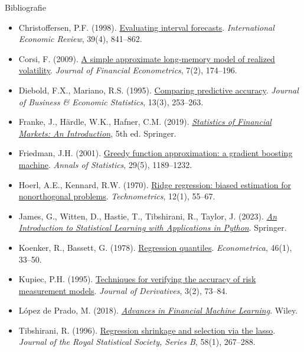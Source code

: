 \begin{frame}{Bibliografie}
\itemsize{\tiny}
\begin{itemize}
    \item Christoffersen, P.F. (1998). \href{https://doi.org/10.2307/2527341}{Evaluating interval forecasts}. \textit{International Economic Review}, 39(4), 841--862.
    \item Corsi, F. (2009). \href{https://doi.org/10.1093/jjfinec/nbp001}{A simple approximate long-memory model of realized volatility}. \textit{Journal of Financial Econometrics}, 7(2), 174--196.
    \item Diebold, F.X., Mariano, R.S. (1995). \href{https://doi.org/10.1080/07350015.1995.10524599}{Comparing predictive accuracy}. \textit{Journal of Business \& Economic Statistics}, 13(3), 253--263.
    \item Franke, J., Härdle, W.K., Hafner, C.M. (2019). \href{https://doi.org/10.1007/978-3-030-13751-9}{\textit{Statistics of Financial Markets: An Introduction}}, 5th ed. Springer.
    \item Friedman, J.H. (2001). \href{https://doi.org/10.1214/aos/1013203451}{Greedy function approximation: a gradient boosting machine}. \textit{Annals of Statistics}, 29(5), 1189--1232.
    \item Hoerl, A.E., Kennard, R.W. (1970). \href{https://doi.org/10.1080/00401706.1970.10488634}{Ridge regression: biased estimation for nonorthogonal problems}. \textit{Technometrics}, 12(1), 55--67.
    \item James, G., Witten, D., Hastie, T., Tibshirani, R., Taylor, J. (2023). \href{https://doi.org/10.1007/978-3-031-38747-0}{\textit{An Introduction to Statistical Learning with Applications in Python}}. Springer.
    \item Koenker, R., Bassett, G. (1978). \href{https://doi.org/10.2307/1913643}{Regression quantiles}. \textit{Econometrica}, 46(1), 33--50.
    \item Kupiec, P.H. (1995). \href{https://doi.org/10.3905/jod.1995.407942}{Techniques for verifying the accuracy of risk measurement models}. \textit{Journal of Derivatives}, 3(2), 73--84.
    \item López de Prado, M. (2018). \href{https://www.wiley.com/en-us/Advances+in+Financial+Machine+Learning-p-9781119482086}{\textit{Advances in Financial Machine Learning}}. Wiley.
    \item Tibshirani, R. (1996). \href{https://doi.org/10.1111/j.2517-6161.1996.tb02080.x}{Regression shrinkage and selection via the lasso}. \textit{Journal of the Royal Statistical Society, Series B}, 58(1), 267--288.
\end{itemize}
\end{frame}


